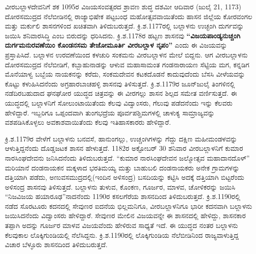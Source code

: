 ವೀರಬಲ್ಲಾಳದೇವನಿಗೆ ಶಕ 1095ರ ವಿಜಯಸಂವತ್ಸರದ ಶ್ರಾವಣ ಶುದ್ಧ ದಶಮೀ ಆದಿವಾರ (ಜುಲೈ 21, 1173) ದೋರಸಮುದ್ರದ ನೆಲೆಬೀಡಿನಲ್ಲಿ ರಾಜ್ಯಾಭಿಷೇಕ ಪಟ್ಟಬಂಧ ಮಹೋತ್ಸವವಾಯಿತೆಂದು ಹಾಸನ ಜಿಲ್ಲೆಯ ಕೋರವಂಗಲ ಮತ್ತು ಮರ್ಕುಲಿ ಶಾಸನಗಳಿಂದ ಖಚಿತವಾಗಿ ತಿಳಿದುಬರುತ್ತದೆ. ಕ್ರಿ.ಶ.1177ರಲ್ಲಿ ಬಲ್ಲಾಳನು ಉಚ್ಛಂಗಿ ದುರ್ಗವನ್ನು ಜಯಿಸಿ ಶನಿವಾರಸಿದ್ಧಿ ಎಂಬ ಬಿರುದನ್ನು ಧರಿಸಿದನು. ಕ್ರಿ.ಶ.1178ರ ಹಟ್ಟಣ ಶಾಸನವು \textbf{“ವಿಜಯಪಾಂಡ್ಯನುಚ್ಚಂಗಿ ದುರ್ಗಮನುರವಣೆಯಿಂ ಕೊಂಡನಸಮ ತೇಜೋಮೂರ್ತಿ ವೀರಬಲ್ಲಾಳ ನೃಪಂ”} ಎಂದು ಈ ವಿಜಯವನ್ನು ಪ್ರಸ್ತಾಪಿಸಿದೆ. ಬಲ್ಲಾಳನ ಉರವಣೆಯಿಂದ ಕಳಚುರಿ ಸಂಕಮನು ವೀರಬಲ್ಲಾಳನ ಮೇಲೆ ಬಿದ್ದನು. ಆಗ ವೀರಬಲ್ಲಾಳನು ದೋರಸಮುದ್ರದ ನೆಲೆಬೀಡಿಗೆ, ಕಬ್ಬಾಹುನಾಡನ್ನು ಆಳುವ ಮಹಾಸಾಮಂತ ಗಂಡನಾರಾಯಣ ಸೆಟ್ಟಿಯ ಮಗ, ಕನ್ನಡಿಗ ಮೊನೆಯಾಳ್ವ ಬಬ್ಬೆಯ ನಾಯಕನನ್ನು ಕರೆದು, ಸಂಕಮದೇವನ ಕಟಕದೊಡನೆ ಕಾದುವುದೆಂದು ಬೆಸಸಿ ವೀಳೆಯವನ್ನು ಕೊಟ್ಟು ಕಳುಹಿಸಿದನೆಂದು ಅಗ್ರಹಾರಬಾಚಹಳ್ಳಿ ಶಾಸನವು ತಿಳಿಸುತ್ತದೆ. ಕ್ರಿ.ಶ.1179ರ ಜೂನ್​ಜುಲೈ ತಿಂಗಳಿನಲ್ಲಿ ನಡೆದಿರಬಹುದಾದ ಘನಘೋರ ಯುದ್ಧದ ಚಿತ್ರವನ್ನು ಈ ವೀರಗಲ್ಲು ಶಾಸನ ಶಿಲ್ಪದ ಸಮೇತ ವರ್ಣಿಸುತ್ತದೆ. ಈ ಯುದ್ಧದಲ್ಲಿ ಬಲ್ಲಾಳನಿಗೆ ಸೋಲುಂಟಾಯಿತೆಂದು ಕೆಲವು ವಿದ್ವಾಂಸರು, ಗೆಲುವು ಪಡೆದನೆಂದು ಇನ್ನು ಕೆಲವರು ಹೇಳಿದ್ದಾರೆ. ಇಬ್ಬರಿಗೂ ಒಪ್ಪಂದವಾಗಿ ತುಂಗಭದ್ರೆಯ ಪೂರ್ವಪಶ್ಚಿಮಗಳಲ್ಲಿ ಚಾಳುಕ್ಯ ಸಾಮ್ರಾಜ್ಯವನ್ನು ವಶಪಡಿಸಿಕೊಳ್ಳಲು ಅವಕಾಶವಾಯಿತೆಂದು ಕೆಲವು ಇತಿಹಾಸಕಾರರು ಹೇಳಿದ್ದಾರೆ.

ಕ್ರಿ.ಶ.1179ರ ವೇಳೆಗೆ ಬಲ್ಲಾಳನು ಬನವಸೆ, ಹಾನುಂಗಲ್ಲು, ಉಚ್ಚಂಗಿಗಳನ್ನು ಗೆದ್ದು ದಕ್ಷಿಣ ಮಹೀಮಂಡಳವನ್ನು ಆಳುತ್ತಿದ್ದನೆಂದು ದೊಡ್ಡಜಟಕ ಶಾಸನ ಹೇಳುತ್ತದೆ. 1182ರ ಅಕ್ಟೋಬರ್​ 30 ಶನಿವಾರ ವೀರಬಲ್ಲಾಳನಿಗೆ ಕುಮಾರ ನಾರಸಿಂಘದೇವನು ಜನಿಸಿದನೆಂದು ತಿಳಿದುಬರುತ್ತದೆ. “ಕುಮಾರ ನಾರಸಿಂಘದೇವನ ಜಲ್ಮೋತ್ಸವ ಮಹಾದಾನದೊಳ್​” ಮರಿಯಾನೆ ದಂಡನಾಯಕನ ಮಕ್ಕಳಾದ ಭರತಿಮಯ್ಯ ಮತ್ತು ಬಾಹುಬಲಿ ದಂಡನಾಯಕರು ಅನೇಕ ಗ್ರಾಮಗಳನ್ನು ದತ್ತಿಯಾಗಿ ಪಡೆದು, ಅಣುವಸಮುದ್ರದಲ್ಲಿ(ಇಂದಿನ ಅಳಿಸಂದ್ರ) ಬಸದಿಯನ್ನು ಕಟ್ಟಿಸಿ ಅದಕ್ಕೆ ದತ್ತಿಯಾಗಿ ಬಿಟ್ಟರೆಂದು ಅಳಿಸಂದ್ರ ಶಾಸನವು ತಿಳಿಸುತ್ತದೆ. ಬಲ್ಲಾಳನು ತುಳುವ, ಕೊಂಕಣ, ಗೂರ್ಜರ, ಮಾಳವ, ಚೋಳಿಕರನ್ನು ಜಯಿಸಿ “ನಿಜವಿಜಯ ಹಯಾರೂಢ”ನಾದನೆಂದು 1190ರ ಕಸಲಗೆರೆಯ ಶಾಸನದಿಂದ ತಿಳಿದುಬರುತ್ತದೆ. ಕ್ರಿ.ಶ.1190ರಲ್ಲಿ ನಡೆದ ಸೊರಟೂರು ಕದನದಲ್ಲಿ ಸೇವುಣರ ಐದನೆಯ ಭಿಲ್ಲಮನಿಗೂ, ವೀರಬಲ್ಲಾಳನಿಗೂ ಭಾರೀ ಕದನವಾಗಿ ಬಲ್ಲಾಳನು ಜಯಿಸಿದನೆಂದು ವಿದ್ವಾಂಸರು ಹೇಳಿದ್ದಾರೆ. ಸೇವುಣರ ಮೇಲಿನ ವಿಜಯವನ್ನೇ ಈ ಶಾಸನದಲ್ಲಿ ಹೇಳಿದ್ದು, ಶಾಸನಕಾರ ತಪ್ಪಾಗಿ ಅದನ್ನು ಗೂರ್ಜರ ಮಾಳವ ವಿಜಯವೆಂದು ಹೇಳಿರುವ ಸಾಧ್ಯತೆ ಇದೆ. ಈ ಯುದ್ಧದ ನಂತರ ಬಲ್ಲಾಳನು ಕೆಲವುಕಾಲ ಲೊಕ್ಕಿಗುಂಡಿಯಲ್ಲಿ ನೆಲೆಸಿದ್ದನು. ಕ್ರಿ.ಶ.1190ರಲ್ಲಿ ಲೊಕ್ಕಿಗುಂಡಿಯ ನೆಲೆಬೀಡಿನಿಂದ ರಾಜ್ಯವಾಳುತ್ತಿದ್ದ ವಿಚಾರ ಬೆಳ್ಳೂರು ಶಾಸನದಿಂದ ತಿಳಿದುಬರುತ್ತದೆ.

